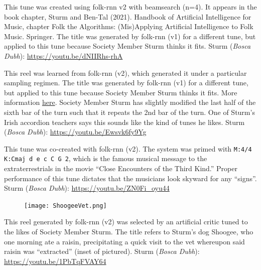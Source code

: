 \documentclass[a4paper,notitlepage,twoside]{book}
\begin{document}
{}  
   
\hypertarget{reel:RoaringSillow}{}
This tune was created using folk-rnn v2 with beamsearch (n=4). It appears in the book chapter,
Sturm and Ben-Tal (2021). Handbook of Artificial Intelligence for Music, chapter Folk the Algorithms: (Mis)Applying Artificial Intelligence to Folk Music. Springer. 
The title was generated by folk-rnn (v1) for a different tune, 
but applied to this tune because Society Member Sturm thinks it fits.
Sturm ({\em Bosca Dubh}): \url{https://youtu.be/dNIIRhs-rhA}

{}  
\hypertarget{reel:MickeyFitternalys}{}
This reel was learned from folk-rnn (v2),
which generated it under a particular sampling regimen.
The title was generated by folk-rnn (v1) for a different tune, 
but applied to this tune because Society Member Sturm thinks it fits.
More information \href{https://highnoongmt.wordpress.com/2019/08/19/making-sense-of-the-folk-rnn-v2-model-part-11/}{here}.
Society Member Sturm has slightly modified the last half of the sixth bar of the turn 
such that it repeats the 2nd bar of the turn. 
One of Sturm's Irish accordion teachers says this sounds like the kind of tunes he likes.
Sturm ({\em Bosca Dubh}): \url{https://youtu.be/Ewsvk6fy9Yg}

{}  
\hypertarget{reel:CloseEncountersReel}{}
This tune was co-created with folk-rnn (v2).
The system was primed with {\tt M:4/4 K:Cmaj d e c C G 2},
which is the famous musical message to the extraterrestrials in 
the movie ``Close Encounters of the Third Kind.''
Proper performance of this tune dictates that the musicians look skyward for any ``signs''.
Sturm ({\em Bosca Dubh}): \url{https://youtu.be/ZN0Fi_oyu44}
  
{}  
  
\hypertarget{reel:DogRaisin}{}
\begin{figure}
\vspace{-0.3in}
\texttt{[image: ShoogeeVet.png]}
\end{figure}
This reel generated by folk-rnn (v2) was selected by an artificial critic 
tuned to the likes of Society Member Sturm.
The title refers to Sturm's dog Shoogee,
who one morning ate a raisin, 
precipitating a quick visit to the vet
whereupon said raisin was ``extracted'' (inset of pictured).
Sturm ({\em Bosca Dubh}): \url{https://youtu.be/1PbTqFVAY64}
\end{document}
